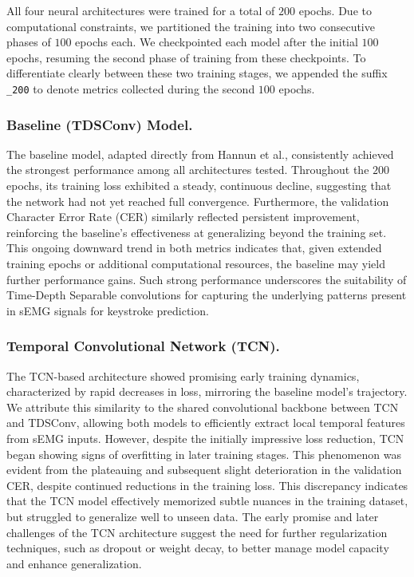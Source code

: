 All four neural architectures were trained for a total of $200$ epochs. Due to computational constraints, we partitioned the training into two consecutive phases of $100$ epochs each. We checkpointed each model after the initial $100$ epochs, resuming the second phase of training from these checkpoints. To differentiate clearly between these two training stages, we appended the suffix \texttt{\_200} to denote metrics collected during the second $100$ epochs.

\subsubsection{Baseline (TDSConv) Model.}

The baseline model, adapted directly from Hannun et al., consistently achieved the strongest performance among all architectures tested. Throughout the $200$ epochs, its training loss exhibited a steady, continuous decline, suggesting that the network had not yet reached full convergence. Furthermore, the validation Character Error Rate (CER) similarly reflected persistent improvement, reinforcing the baseline’s effectiveness at generalizing beyond the training set. This ongoing downward trend in both metrics indicates that, given extended training epochs or additional computational resources, the baseline may yield further performance gains. Such strong performance underscores the suitability of Time-Depth Separable convolutions for capturing the underlying patterns present in sEMG signals for keystroke prediction.

\subsubsection{Temporal Convolutional Network (TCN).}

The TCN-based architecture showed promising early training dynamics, characterized by rapid decreases in loss, mirroring the baseline model’s trajectory. We attribute this similarity to the shared convolutional backbone between TCN and TDSConv, allowing both models to efficiently extract local temporal features from sEMG inputs. However, despite the initially impressive loss reduction, TCN began showing signs of overfitting in later training stages. This phenomenon was evident from the plateauing and subsequent slight deterioration in the validation CER, despite continued reductions in the training loss. This discrepancy indicates that the TCN model effectively memorized subtle nuances in the training dataset, but struggled to generalize well to unseen data. The early promise and later challenges of the TCN architecture suggest the need for further regularization techniques, such as dropout or weight decay, to better manage model capacity and enhance generalization.

